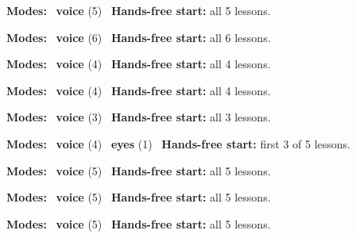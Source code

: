 \expandafter\def\csname hlchaptermodality267\endcsname{%
  {\small\noindent
    \textbf{Modes:} \hlvoicesign{}~\textbf{voice} (5)\quad
    \hlvoicesign{}~\textbf{Hands-free start:} all 5 lessons.%
    \par}\medskip
}

\expandafter\def\csname hlchaptermodality268\endcsname{%
  {\small\noindent
    \textbf{Modes:} \hlvoicesign{}~\textbf{voice} (6)\quad
    \hlvoicesign{}~\textbf{Hands-free start:} all 6 lessons.%
    \par}\medskip
}

\expandafter\def\csname hlchaptermodality269\endcsname{%
  {\small\noindent
    \textbf{Modes:} \hlvoicesign{}~\textbf{voice} (4)\quad
    \hlvoicesign{}~\textbf{Hands-free start:} all 4 lessons.%
    \par}\medskip
}

\expandafter\def\csname hlchaptermodality270\endcsname{%
  {\small\noindent
    \textbf{Modes:} \hlvoicesign{}~\textbf{voice} (4)\quad
    \hlvoicesign{}~\textbf{Hands-free start:} all 4 lessons.%
    \par}\medskip
}

\expandafter\def\csname hlchaptermodality271\endcsname{%
  {\small\noindent
    \textbf{Modes:} \hlvoicesign{}~\textbf{voice} (3)\quad
    \hlvoicesign{}~\textbf{Hands-free start:} all 3 lessons.%
    \par}\medskip
}

\expandafter\def\csname hlchaptermodality272\endcsname{%
  {\small\noindent
    \textbf{Modes:} \hlvoicesign{}~\textbf{voice} (4) \quad \hlsightsign{}~\textbf{eyes} (1)\quad
    \hlvoicesign{}~\textbf{Hands-free start:} first 3 of 5 lessons.%
    \par}\medskip
}

\expandafter\def\csname hlchaptermodality273\endcsname{%
  {\small\noindent
    \textbf{Modes:} \hlvoicesign{}~\textbf{voice} (5)\quad
    \hlvoicesign{}~\textbf{Hands-free start:} all 5 lessons.%
    \par}\medskip
}

\expandafter\def\csname hlchaptermodality274\endcsname{%
  {\small\noindent
    \textbf{Modes:} \hlvoicesign{}~\textbf{voice} (5)\quad
    \hlvoicesign{}~\textbf{Hands-free start:} all 5 lessons.%
    \par}\medskip
}

\expandafter\def\csname hlchaptermodality275\endcsname{%
  {\small\noindent
    \textbf{Modes:} \hlvoicesign{}~\textbf{voice} (5)\quad
    \hlvoicesign{}~\textbf{Hands-free start:} all 5 lessons.%
    \par}\medskip
}


